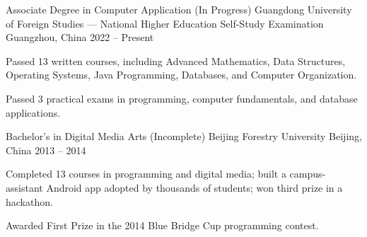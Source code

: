 
\begin{cventries}

  \cventry
    {Associate Degree in Computer Application (In Progress)} %
    {Guangdong University of Foreign Studies --- National Higher Education Self-Study Examination} %
    {Guangzhou, China} %
    {2022 -- Present} %
    {
      \begin{cvitems}
        \item {Passed 13 written courses, including Advanced Mathematics, Data Structures, Operating Systems, Java Programming, Databases, and Computer Organization.}
        \item {Passed 3 practical exams in programming, computer fundamentals, and database applications.}
      \end{cvitems}
    }

  \cventry
    {Bachelor's in Digital Media Arts (Incomplete)} %
    {Beijing Forestry University} %
    {Beijing, China} %
    {2013 -- 2014} %
    {
      \begin{cvitems}
        \item {Completed 13 courses in programming and digital media; built a campus-assistant Android app adopted by thousands of students; won third prize in a hackathon.}
        \item {Awarded First Prize in the 2014 Blue Bridge Cup programming contest.}
      \end{cvitems}
    }

\end{cventries}
